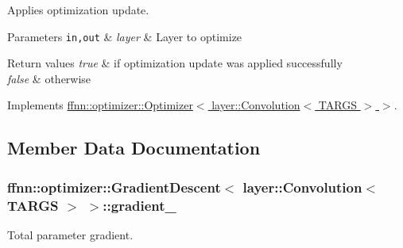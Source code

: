 Applies optimization update. 


\begin{DoxyParams}[1]{Parameters}
\mbox{\tt in,out}  & {\em layer} & Layer to optimize \\
\hline
\end{DoxyParams}

\begin{DoxyRetVals}{Return values}
{\em true} & if optimization update was applied successfully \\
\hline
{\em false} & otherwise \\
\hline
\end{DoxyRetVals}


Implements \hyperlink{classffnn_1_1optimizer_1_1_optimizer_a7c88c2794446e03ccd41628bb25d7a07}{ffnn\-::optimizer\-::\-Optimizer$<$ layer\-::\-Convolution$<$ T\-A\-R\-G\-S $>$ $>$}.



\subsection{Member Data Documentation}
\hypertarget{classffnn_1_1optimizer_1_1_gradient_descent_3_01layer_1_1_convolution_3_01_t_a_r_g_s_01_4_01_4_a2e5183618894852cb53de619372d6ad1}{
\subsubsection[{gradient\-\_\-}]{ {\bf ffnn\-::optimizer\-::\-Gradient\-Descent}$<$ {\bf layer\-::\-Convolution}$<$ {\bf T\-A\-R\-G\-S} $>$ $>$\-::gradient\-\_\-\hspace{0.3cm}{\ttfamily [protected]}}}\label{classffnn_1_1optimizer_1_1_gradient_descent_3_01layer_1_1_convolution_3_01_t_a_r_g_s_01_4_01_4_a2e5183618894852cb53de619372d6ad1}


Total parameter gradient. 

